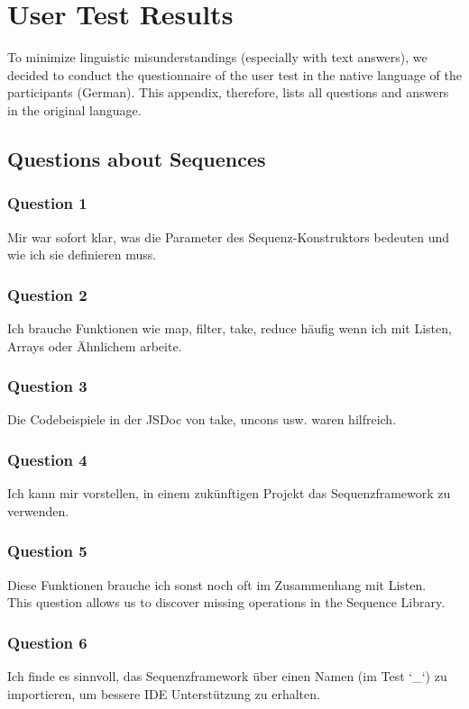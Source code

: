 \chapter{User Test Results}
\label{chap:app_user_test_results}
To minimize linguistic misunderstandings (especially with text answers), we
decided to conduct the questionnaire of the user test in the native language of
the participants (German). This appendix, therefore, lists all questions and
answers in the original language.
\section{Questions about Sequences} %
\label{sec:Questions about Sequences}
\subsection*{Question 1}
\label{sub:ut_q1}
Mir war sofort klar, was die Parameter des Sequenz-Konstruktors bedeuten und wie ich sie definieren muss.
\subsection*{Question 2}
\label{sub:ut_q2}
Ich brauche Funktionen wie map, filter, take, reduce häufig wenn ich mit Listen, Arrays oder Ähnlichem arbeite.

\subsection*{Question 3}
\label{sub:ut_q3}
Die Codebeispiele in der JSDoc von take, uncons usw. waren hilfreich. 
\subsection*{Question 4}
\label{sub:ut_q4}
Ich kann mir vorstellen, in einem zukünftigen Projekt das Sequenzframework zu verwenden.
\subsection*{Question 5}
Diese Funktionen brauche ich sonst noch oft im Zusammenhang mit Listen. \\
This question allows us to discover missing operations in the Sequence Library.
\label{sub:ut_q5}
\subsection*{Question 6}
\label{sub:ut_q6}
Ich finde es sinnvoll, das Sequenzframework über einen Namen (im Test `\_`) zu importieren, um bessere IDE Unterstützung zu erhalten.
